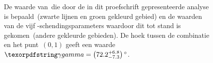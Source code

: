 \begin{otherlanguage}{dutch}
\begin{figure}[htb]
    \caption{
        De waarde van~\CPgamma die door de in dit proefschrift gepresenteerde analyse is bepaald~(zwarte lijnen en groen gekleurd gebied) en de waarden van de vijf \CP-schendingsparameters waardoor dit tot stand is gekomen~(andere gekleurde gebieden).
        De hoek tussen de combinatie en het punt~\({(0, 1)}\) geeft een waarde~\({\CPgamma = \ang[parse-numbers=false]{\left(\num{72.2}_{\num{-7.3}}^{+\num{6.8}}\right)}}\).}
    \label{fig:samenvatting_gamma}
\end{figure}

\end{otherlanguage}

